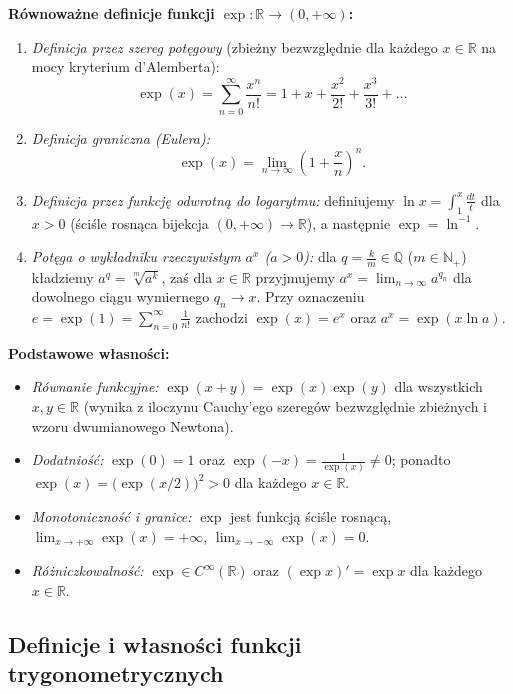 \documentclass[11pt, a4paper]{article}
\theoremstyle{plain}
\theoremstyle{definition}
\begin{document}
\noindent\textbf{Równoważne definicje funkcji $\exp \colon \mathbb{R} \to (0, +\infty)$:}
\begin{enumerate}
    \item \emph{Definicja przez szereg potęgowy} (zbieżny bezwzględnie dla każdego $x \in \mathbb{R}$ na mocy kryterium d'Alemberta):
    \[
    \exp(x) = \sum_{n=0}^{\infty} \frac{x^n}{n!} = 1 + x + \frac{x^2}{2!} + \frac{x^3}{3!} + \dots
    \]
    \item \emph{Definicja graniczna (Eulera):}
    \[
    \exp(x) = \lim_{n\to\infty} \left(1 + \frac{x}{n}\right)^n.
    \]
    \item \emph{Definicja przez funkcję odwrotną do logarytmu:} definiujemy $\ln x = \int_1^x \frac{dt}{t}$ dla $x > 0$ (ściśle rosnąca bijekcja $(0, +\infty) \to \mathbb{R}$), a następnie $\exp = \ln^{-1}$.
    \item \emph{Potęga o wykładniku rzeczywistym $a^x$ ($a > 0$):} dla $q = \frac{k}{m} \in \mathbb{Q}$ ($m \in \mathbb{N}_+$) kładziemy $a^q = \sqrt[m]{a^k}$, zaś dla $x \in \mathbb{R}$ przyjmujemy $a^x = \lim_{n\to\infty} a^{q_n}$ dla dowolnego ciągu wymiernego $q_n \to x$. Przy oznaczeniu $e = \exp(1) = \sum_{n=0}^\infty \frac{1}{n!}$ zachodzi $\exp(x) = e^x$ oraz $a^x = \exp(x \ln a)$.
\end{enumerate}

\noindent\textbf{Podstawowe własności:}
\begin{itemize}
    \item \emph{Równanie funkcyjne:} $\exp(x + y) = \exp(x)\exp(y)$ dla wszystkich $x, y \in \mathbb{R}$ (wynika z iloczynu Cauchy'ego szeregów bezwzględnie zbieżnych i wzoru dwumianowego Newtona).
    \item \emph{Dodatniość:} $\exp(0) = 1$ oraz $\exp(-x) = \frac{1}{\exp(x)} \neq 0$; ponadto $\exp(x) = \bigl(\exp(x/2)\bigr)^2 > 0$ dla każdego $x \in \mathbb{R}$.
    \item \emph{Monotoniczność i granice:} $\exp$ jest funkcją ściśle rosnącą, $\lim_{x\to+\infty} \exp(x) = +\infty$, $\lim_{x\to-\infty} \exp(x) = 0$.
    \item \emph{Różniczkowalność:} $\exp \in C^\infty(\mathbb{R})$ oraz $(\exp x)' = \exp x$ dla każdego $x \in \mathbb{R}$.
\end{itemize}

\subsection{Definicje i własności funkcji trygonometrycznych}
\end{document}
